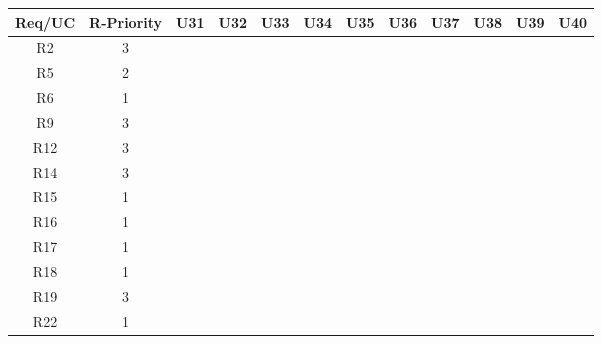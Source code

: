 \documentclass[12pt]{article}
\begin{document}
\newpage
\begin{longtable}{|c|c|c|c|c|c|c|c|c|c|c|c|}
	\hline
	Req/UC      & R-Priority & U31      & U32      & U33      & U34      & U35      & U36      & U37      & U38      & U39      & U40      \\
	\hline
	R2          & 3          &           &           &           &           &           &           &           &           &           &           \\
	\hline
	R5          & 2          &           &           &           &           &           &           &           &           &           &           \\
	\hline
	R6          & 1          &           &           &           &           &           &           &           &           &           &           \\
	\hline
	R9          & 3          &           &           &           &           &           &           &           &           &           &           \\
	\hline
	R12         & 3          &           &           &           &           &           &           &           &           & \ding{51} &           \\
	\hline
	R14         & 3          &           &           &           &           &           &           &           &           &           &           \\
	\hline
	R15         & 1          &           &           &           &           &           &           &           &           &           &           \\
	\hline
	R16         & 1          &           &           &           &           &           &           &           &           &           &           \\
	\hline
	R17         & 1          &           &           &           &           &           &           &           &           &           &           \\
	\hline
	R18         & 1          &           &           &           &           &           &           &           &           &           &           \\
	\hline
	R19         & 3          &           &           &           &           &           &           &           &           &           &           \\
	\hline
	R22         & 1          &           &           &           &           &           &           &           &           &           &           \\

\end{longtable}
\end{document}
